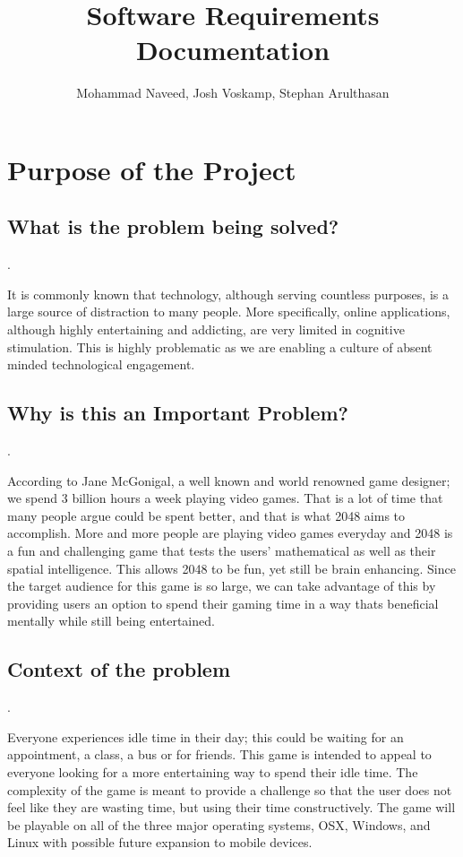 \documentclass[12pt]{article}
\title{Software Requirements Documentation}
\author{Mohammad Naveed, Josh Voskamp, Stephan Arulthasan}
\begin{document}
\maketitle
\newpage
\tableofcontents
\newpage

\section{Purpose of the Project}
\subsection{What is the problem being solved?} 
.\par
It is commonly known that technology, although serving countless purposes, is a large source of distraction to many people. More specifically, online applications, although highly entertaining and addicting, are very limited in cognitive stimulation. This is highly problematic as we are enabling a culture of absent minded technological engagement.
\subsection{Why is this an Important Problem?} 
.\par
According to Jane McGonigal, a well known and world renowned game designer; we spend 3 billion hours a week playing video games. That is a lot of time that many people argue could be spent better, and that is what 2048 aims to accomplish. More and more people are playing video games everyday and 2048 is a fun and challenging game that tests the users' mathematical as well as their spatial intelligence. This allows 2048 to be fun, yet still be brain enhancing. Since the target audience for this game is so large, we can take advantage of this by providing users an option to spend their gaming time in a way thats beneficial mentally while still being entertained.
\subsection{Context of the problem} 
.\par Everyone experiences idle time in their day; this could be waiting for an appointment, a class, a bus or for friends. This game is intended to appeal to everyone looking for a more entertaining way to spend their idle time. The complexity of the game is meant to provide a challenge so that the user does not feel like they are wasting time, but using their time constructively. The game will be playable on all of the three major operating systems, OSX, Windows, and Linux with possible future expansion to mobile devices.
\end{document}
